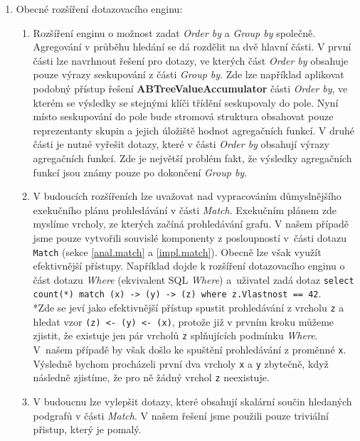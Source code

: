 \begin{enumerate}

\item Obecné rozšíření dotazovacího enginu:

\begin{enumerate}

\item 
Rozšíření enginu o možnost zadat \textit{Order by} a \textit{Group by} společně.
Agregování v průběhu hledání se dá rozdělit na dvě hlavní části.
V první části lze navrhnout řešení pro dotazy, ve kterých část \textit{Order by} obsahuje pouze výrazy seskupování z části \textit{Group by}.
Zde lze například aplikovat podobný přístup řešení \textbf{ABTreeValueAccumulator} části \textit{Order by}, ve kterém se výsledky se stejnými klíči třídění seskupovaly do pole.
Nyní místo seskupování do pole bude stromová struktura obsahovat pouze reprezentanty skupin a jejich úložiště hodnot agregačních funkcí.
V druhé části je nutné vyřešit dotazy, které v části \textit{Order by} obsahují výrazy agregačních funkcí.
Zde je největší problém fakt, že výsledky agregačních funkcí jsou známy pouze po dokončení \textit{Group by}.

\item
V budoucích rozšířeních lze uvažovat nad vypracováním důmyslnějšího exekučního plánu prohledávání v části \textit{Match}.
Exekučním plánem zde myslíme vrcholy, ze kterých začíná prohledávání grafu.
V našem případě jsme pouze vytvořili souvislé komponenty z posloupností v~části dotazu \texttt{Match} (sekce \ref{anal.match} a \ref{impl.match}).
Obecně lze však využít efektivnější přístupy.
Například dojde k rozšíření dotazovacího enginu o část dotazu \textit{Where} (ekvivalent SQL \textit{Where}) a~uživatel zadá dotaz \texttt{select count(*) match (x) -> (y) -> (z) where z.Vlastnost == 42}.
\\*Zde se jeví jako efektivnější přístup spustit prohledávání z vrcholu \texttt{z} a hledat vzor \texttt{(z) <- (y) <- (x)}, protože již v prvním kroku můžeme zjistit, že existuje jen pár vrcholů \texttt{z} splňujících podmínku \textit{Where}.
V~našem případě by však došlo ke spuštění prohledávání z proměnné \texttt{x}.
Výsledně bychom procházeli první dva vrcholy \texttt{x} a \texttt{y} zbytečně, když následně zjistíme, že pro ně žádný vrchol \texttt{z} neexistuje.

\item
V budoucnu lze vylepšit dotazy, které obsahují skalární součin hledaných podgrafů v části \textit{Match}.
V našem řešení jsme použili pouze triviální přistup, který je pomalý.


\end{enumerate}
\end{enumerate}
